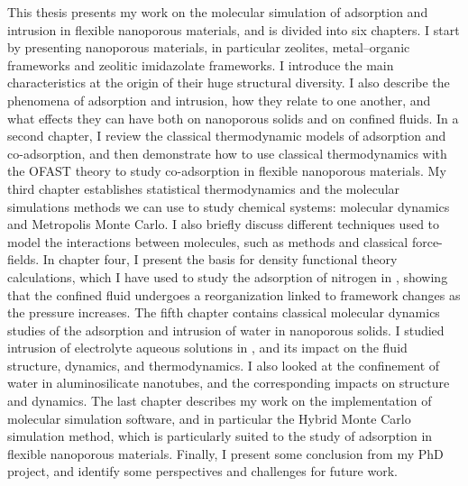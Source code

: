 This thesis presents my work on the molecular simulation of adsorption and
intrusion in flexible nanoporous materials, and is divided into six chapters. I
start by presenting nanoporous materials, in particular zeolites, metal--organic
frameworks and zeolitic imidazolate frameworks. I introduce the main
characteristics at the origin of their huge structural diversity. I also
describe the phenomena of adsorption and intrusion, how they relate to one
another, and what effects they can have both on nanoporous solids and on
confined fluids. In a second chapter, I review the classical thermodynamic
models of adsorption and co-adsorption, and then demonstrate how to use
classical thermodynamics with the OFAST theory to study co-adsorption in
flexible nanoporous materials. My third chapter establishes statistical
thermodynamics and the molecular simulations methods we can use to study
chemical systems: molecular dynamics and Metropolis Monte Carlo. I also briefly
discuss different techniques used to model the interactions between molecules,
such as \abinitio methods and classical force-fields. In chapter four, I present
the basis for density functional theory calculations, which I have used to study
the adsorption of nitrogen in , showing that the confined fluid undergoes a
reorganization linked to framework changes as the pressure increases. The fifth
chapter contains classical molecular dynamics studies of the adsorption and
intrusion of water in nanoporous solids. I studied intrusion of electrolyte
aqueous solutions in , and its impact on the fluid structure, dynamics, and
thermodynamics. I also looked at the confinement of water in aluminosilicate
nanotubes, and the corresponding impacts on structure and dynamics. The last
chapter describes my work on the implementation of molecular simulation
software, and in particular the Hybrid Monte Carlo simulation method, which is
particularly suited to the study of adsorption in flexible nanoporous materials.
Finally, I present some conclusion from my PhD project, and identify some
perspectives and challenges for future work.

\vfill
\begin{center}
\end{center}
\vfill\vfill
